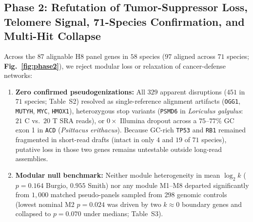 \documentclass[10pt,a4paper,twocolumn]{article}
\begin{document}
\subsection{Phase 2: Refutation of Tumor-Suppressor Loss, Telomere Signal, 71-Species Confirmation, and Multi-Hit Collapse}
Across the $87$ alignable H8 panel genes in $58$ species ($97$ aligned across $71$ species; \textbf{Fig.~\ref{fig:phase2}}), we reject modular loss or relaxation of cancer-defense networks:
\begin{enumerate}
    \item \textbf{Zero confirmed pseudogenizations:} All $329$ apparent disruptions ($451$ in $71$ species; Table~S2) resolved as single-reference alignment artifacts (\texttt{OGG1}, \texttt{MUTYH}, \texttt{MYC}, \texttt{HMOX1}), heterozygous stop variants (\texttt{PSMD6} in \textit{Loriculus galgulus}: $21$ C vs.\ $20$ T SRA reads), or $0\times$ Illumina dropout across a $75$--$77\%$ GC exon 1 in \texttt{ACD} (\textit{Psittacus erithacus}). Because GC-rich \texttt{TP53} and \texttt{RB1} remained fragmented in short-read drafts (intact in only $4$ and $19$ of $71$ species), putative loss in those two genes remains untestable outside long-read assemblies.
    \item \textbf{Modular null benchmark:} Neither module heterogeneity in mean $\log_2 k$ ($p = 0.164$ Burgio, $0.955$ Smith) nor any module M1--M8 departed significantly from $1,000$ matched pseudo-panels sampled from $298$ genomic controls (lowest nominal M2 $p = 0.024$ was driven by two $k \approx 0$ boundary genes and collapsed to $p = 0.070$ under medians; Table~S3).

\end{enumerate}
\end{document}
